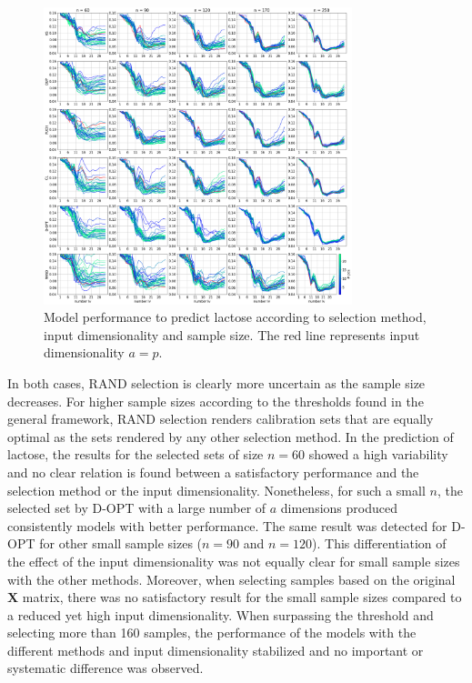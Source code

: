 \documentclass[journal=ancham,manuscript=article]{achemso}
\begin{document}
\begin{figure}[b]
\includegraphics[width=0.8\textwidth]{manuscript/figures/d01_milk_model_performance.png}
\centering
\caption{Model performance to predict lactose according to selection method, input dimensionality and sample size. The red line represents input dimensionality $a=p$.}
\label{fig_d01_milk_model_performance}
\end{figure}

In both cases, RAND selection is clearly more uncertain as the sample size decreases. For higher sample sizes according to the thresholds found in the general framework, RAND selection renders calibration sets that are equally optimal as the sets rendered by any other selection method. In the prediction of lactose, the results for the selected sets of size $n=60$ showed a high variability and no clear relation is found between a satisfactory performance and the selection method or the input dimensionality. Nonetheless, for such a small $n$, the selected set by D-OPT with a large number of $a$ dimensions produced consistently models with better performance. The same result was detected for D-OPT for other small sample sizes ($n=90$ and $n=120$). This differentiation of the effect of the input dimensionality was not equally clear for small sample sizes with the other methods. Moreover, when selecting samples based on the original $\mathbf{X}$ matrix, there was no satisfactory result for the small sample sizes compared to a reduced yet high input dimensionality. When surpassing the threshold and selecting more than 160 samples, the performance of the models with the different methods and input dimensionality stabilized and no important or systematic difference was observed.
\end{document}
